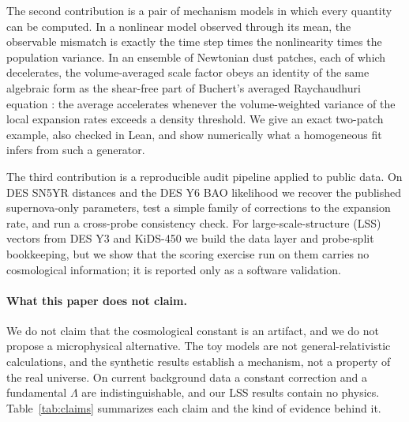 \documentclass[11pt]{article}
\theoremstyle{plain}
\theoremstyle{definition}
\theoremstyle{remark}
\begin{document}
The second contribution is a pair of mechanism models in which every quantity can be computed. In a nonlinear model observed through its mean, the observable mismatch is exactly the time step times the nonlinearity times the population variance. In an ensemble of Newtonian dust patches, each of which decelerates, the volume-averaged scale factor obeys an identity of the same algebraic form as the shear-free part of Buchert's averaged Raychaudhuri equation \cite{Buchert2000Dust,Buchert2001PerfectFluid}: the average accelerates whenever the volume-weighted variance of the local expansion rates exceeds a density threshold. We give an exact two-patch example, also checked in Lean, and show numerically what a homogeneous fit infers from such a generator.

The third contribution is a reproducible audit pipeline applied to public data. On DES SN5YR distances and the DES Y6 BAO likelihood we recover the published supernova-only parameters, test a simple family of corrections to the expansion rate, and run a cross-probe consistency check. For large-scale-structure (LSS) vectors from DES Y3 and KiDS-450 we build the data layer and probe-split bookkeeping, but we show that the scoring exercise run on them carries no cosmological information; it is reported only as a software validation.

\paragraph{What this paper does not claim.}
We do not claim that the cosmological constant is an artifact, and we do not propose a microphysical alternative. The toy models are not general-relativistic calculations, and the synthetic results establish a mechanism, not a property of the real universe. On current background data a constant correction and a fundamental $\Lambda$ are indistinguishable, and our LSS results contain no physics. Table~\ref{tab:claims} summarizes each claim and the kind of evidence behind it.
\end{document}
